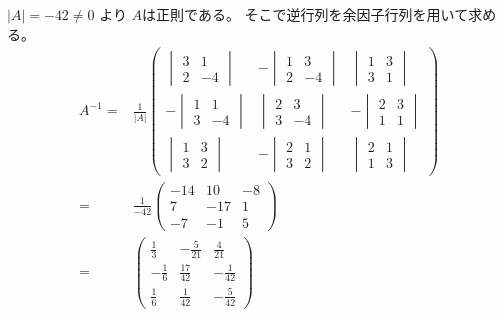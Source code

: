 \documentclass[10pt,a4paper]{ltjsarticle}
\begin{document}
\begin{enumerate}
       $\lvert A \rvert = -42 \ne 0$ より $A$は正則である。
       そこで逆行列を余因子行列を用いて求める。
        \begin{align}
         A^{-1} =&
          \frac{1}{\lvert A \rvert}
          \begin{pmatrix}
           \begin{vmatrix} 3 & 1\\ 2 & -4\end{vmatrix} &
           -\begin{vmatrix} 1 & 3\\ 2 & -4\end{vmatrix} &
           \begin{vmatrix} 1 & 3\\ 3 & 1\end{vmatrix}\\[10pt]
           -\begin{vmatrix} 1 & 1\\ 3 & -4\end{vmatrix} &
           \begin{vmatrix} 2 & 3\\ 3 & -4\end{vmatrix} &
           -\begin{vmatrix} 2 & 3\\ 1 & 1\end{vmatrix}\\[10pt]
           \begin{vmatrix} 1 & 3\\ 3 & 2\end{vmatrix} &
           -\begin{vmatrix} 2 & 1\\ 3 & 2\end{vmatrix} &
           \begin{vmatrix} 2 & 1\\ 1 & 3\end{vmatrix}
          \end{pmatrix}\\
         =& \frac{1}{-42}
          \begin{pmatrix}
           -14 & 10 & -8\\
           7 & -17 & 1\\
           -7 & -1 & 5
          \end{pmatrix}\\
         =& 
          \begin{pmatrix}
           \frac{1}{3} & -\frac{5}{21} & \frac{4}{21}\\[3pt]
           -\frac{1}{6} & \frac{17}{42} & -\frac{1}{42}\\[3pt]
           \frac{1}{6} & \frac{1}{42} & -\frac{5}{42}
          \end{pmatrix}
        \end{align}


\end{enumerate}
\end{document}
